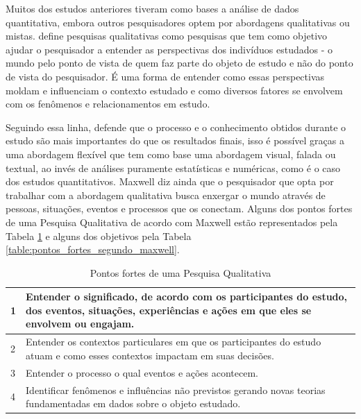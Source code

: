 Muitos dos estudos anteriores tiveram como bases a análise de dados quantitativa, embora outros pesquisadores optem por abordagens qualitativas ou mistas.  define pesquisas qualitativas como pesquisas que tem como objetivo ajudar o pesquisador a entender as perspectivas dos indivíduos estudados - o mundo pelo ponto de vista de quem faz parte do objeto de estudo e não do ponto de vista do pesquisador. É uma forma de entender como essas perspectivas moldam e influenciam o contexto estudado e como diversos fatores se envolvem com os fenômenos e relacionamentos em estudo. 

Seguindo essa linha,  defende que o processo e o conhecimento obtidos durante o estudo são mais importantes do que os resultados finais, isso é possível graças a uma abordagem flexível que tem como base uma abordagem visual, falada ou textual, ao invés de análises puramente estatísticas e numéricas, como é o caso dos estudos quantitativos. Maxwell diz ainda que o pesquisador que opta por trabalhar com a abordagem qualitativa busca enxergar o mundo através de pessoas, situações, eventos e processos que os conectam. Alguns dos pontos fortes de uma Pesquisa Qualitativa de acordo com Maxwell estão representados pela Tabela \ref{table:objetivos_intelectuais_segundo_maxwell} e alguns dos objetivos pela Tabela \ref{table:pontos_fortes_segundo_maxwell}.

\begin{table}[!htb]
	\centering
	\begin{tabular}{ | p{3cm} | p{12cm} | }
		\hline
		1 & Entender o significado, de acordo com os participantes do estudo, dos eventos, situações, experiências e ações em que eles se envolvem ou engajam. \\ \hline
		2 & Entender os contextos particulares em que os participantes do estudo atuam e como esses contextos impactam em suas decisões. \\ \hline
		3 & Entender o processo o qual eventos e ações acontecem. \\ \hline
		4 & Identificar fenômenos e influências não previstos gerando novas teorias fundamentadas em dados sobre o objeto estudado. \\ \hline
	\end{tabular}
	\caption{Pontos fortes de uma Pesquisa Qualitativa}
	\label{table:objetivos_intelectuais_segundo_maxwell}
\end{table}

